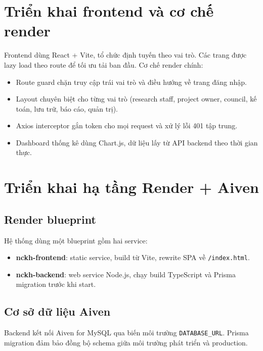 \documentclass[12pt,a4paper]{report}
\begin{document}
\section{Triển khai frontend và cơ chế render}
Frontend dùng React + Vite, tổ chức định tuyến theo vai trò. Các trang được lazy load theo route để tối ưu tải ban đầu. Cơ chế render chính:
\begin{itemize}[leftmargin=1.2cm]
\item Route guard chặn truy cập trái vai trò và điều hướng về trang đăng nhập.
\item Layout chuyên biệt cho từng vai trò (research staff, project owner, council, kế toán, lưu trữ, báo cáo, quản trị).
\item Axios interceptor gắn token cho mọi request và xử lý lỗi 401 tập trung.
\item Dashboard thống kê dùng Chart.js, dữ liệu lấy từ API backend theo thời gian thực.
\end{itemize}

\section{Triển khai hạ tầng Render + Aiven}
\subsection{Render blueprint}
Hệ thống dùng một blueprint gồm hai service:
\begin{itemize}[leftmargin=1.2cm]
\item \textbf{nckh-frontend}: static service, build từ Vite, rewrite SPA về \texttt{/index.html}.
\item \textbf{nckh-backend}: web service Node.js, chạy build TypeScript và Prisma migration trước khi start.
\end{itemize}

\subsection{Cơ sở dữ liệu Aiven}
Backend kết nối Aiven for MySQL qua biến môi trường \texttt{DATABASE\_URL}. Prisma migration đảm bảo đồng bộ schema giữa môi trường phát triển và production.
\end{document}
